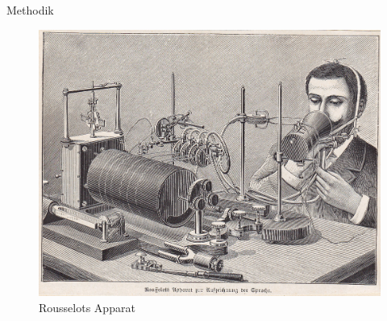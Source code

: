 \begin{frame}{Methodik}

	\begin{figure}
		\centering
		
		\includegraphics[scale=0.1]{material/04RousselotsApparatzurAufzeichnungderSprache}
		\caption{Rousselots Apparat}
	\end{figure}
	
\end{frame}




		
	


